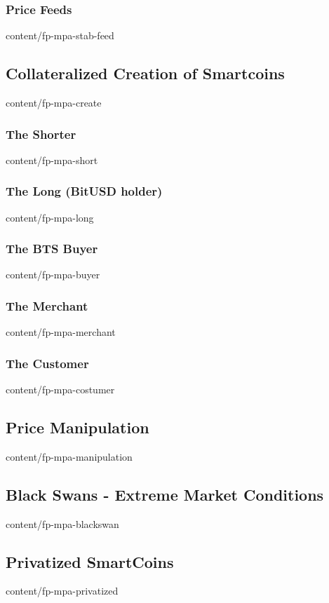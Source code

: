 \documentclass[conference,final,10pt,a4paper]{IEEEtran}
\begin{document}
\subsubsection { Price Feeds                                     }  { content/fp-mpa-stab-feed       } 

\subsection    { Collateralized Creation of Smartcoins           }  { content/fp-mpa-create          } 
\subsubsection { The Shorter                                     }  { content/fp-mpa-short           } 
\subsubsection { The Long (BitUSD holder)                        }  { content/fp-mpa-long            } 
\subsubsection { The BTS Buyer                                   }  { content/fp-mpa-buyer           } 
\subsubsection { The Merchant                                    }  { content/fp-mpa-merchant        } 
\subsubsection { The Customer                                    }  { content/fp-mpa-costumer        } 
\subsection    { Price Manipulation                              }  { content/fp-mpa-manipulation    } 
\subsection    { Black Swans - Extreme Market Conditions         }  { content/fp-mpa-blackswan       } 
\subsection    { Privatized SmartCoins                           }  { content/fp-mpa-privatized      } 
\end{document}
